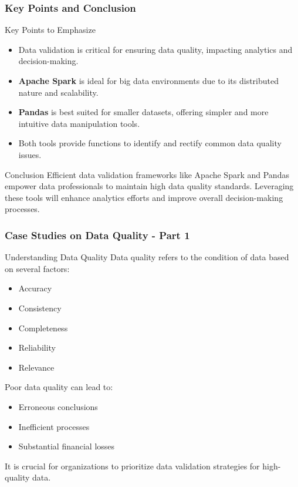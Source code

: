 \documentclass[aspectratio=169]{beamer}
\begin{document}
\begin{frame}[fragile]
    \frametitle{Key Points and Conclusion}
    \begin{block}{Key Points to Emphasize}
        \begin{itemize}
            \item Data validation is critical for ensuring data quality, impacting analytics and decision-making.
            \item \textbf{Apache Spark} is ideal for big data environments due to its distributed nature and scalability.
            \item \textbf{Pandas} is best suited for smaller datasets, offering simpler and more intuitive data manipulation tools.
            \item Both tools provide functions to identify and rectify common data quality issues.
        \end{itemize}
    \end{block}
    \begin{block}{Conclusion}
        Efficient data validation frameworks like Apache Spark and Pandas empower data professionals to maintain high data quality standards. Leveraging these tools will enhance analytics efforts and improve overall decision-making processes.
    \end{block}
\end{frame}

\begin{frame}[fragile]
    \frametitle{Case Studies on Data Quality - Part 1}
    
    \begin{block}{Understanding Data Quality}
        Data quality refers to the condition of data based on several factors:
        \begin{itemize}
            \item Accuracy
            \item Consistency
            \item Completeness
            \item Reliability
            \item Relevance
        \end{itemize}
        Poor data quality can lead to:
        \begin{itemize}
            \item Erroneous conclusions
            \item Inefficient processes
            \item Substantial financial losses
        \end{itemize}
        It is crucial for organizations to prioritize data validation strategies for high-quality data.
    \end{block}
\end{frame}
\end{document}
